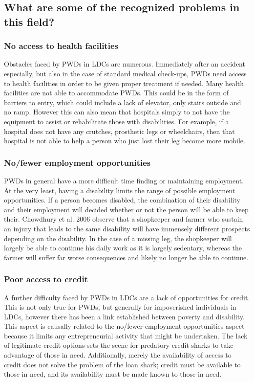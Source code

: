 \documentclass[a4paper]{article}
\begin{document}
\subsection{What are some of the recognized problems in this field?}

\subsubsection{No access to health facilities}

Obstacles faced by PWDs in LDCs are numerous. Immediately after an accident
especially, but also in the case of standard medical check-ups, PWDs need
access to health facilities in order to be given proper treatment if needed.
Many health facilities are not able to accommodate PWDs. This could be in the
form of barriers to entry, which could include a lack of elevator, only stairs
outside and no ramp. However this can also mean that hospitals simply to not
have the equipment to assist or rehabilitate those with disabilities. For
example, if a hospital does not have any crutches, prosthetic legs or
wheelchairs, then that hospital is not able to help a person who just lost
their leg become more mobile. 


\subsubsection{No/fewer employment opportunities}

PWDs in general have a more difficult time finding or maintaining employment.
At the very least, having a disability limits the range of possible employment
opportunities. If a person becomes disabled, the combination of their
disability and their employment will decided whether or not the person will be
able to keep their. Chowdhury et al. 2006 observe that a shopkeeper and farmer
who sustain an injury that leads to the same disability will have immensely
different prospects depending on the disability. In the case of a missing leg,
the shopkeeper will largely be able to continue his daily work as it is
largely sedentary, whereas the farmer will suffer far worse consequences and
likely no longer be able to continue.

\subsubsection{Poor access to credit}

A further difficulty faced by PWDs in LDCs are a lack of opportunities for
credit. This is not only true for PWDs, but generally for impoverished
individuals in LDCs, however there has been a link established between poverty
and disability. This aspect is causally related to the no/fewer employment
opportunities aspect because it limits any entrepreneurial activity that might
be undertaken. The lack of legitimate credit options sets the scene for
predatory credit sharks to take advantage of those in need. Additionally,
merely the availability of access to credit does not solve the problem of the
loan shark; credit must be available to those in need, and its availability
must be made known to those in need.
\end{document}
